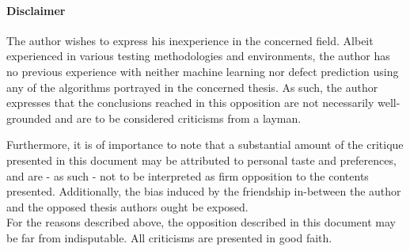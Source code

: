 
\paragraph{Disclaimer}
\label{par:disclaimer}
The author wishes to express his inexperience in the concerned field.
Albeit experienced in various testing methodologies and environments, the author has no previous experience with neither machine learning nor defect prediction using any of the algorithms portrayed in the concerned thesis.
As such, the author expresses that the conclusions reached in this opposition are not necessarily well-grounded and are to be considered criticisms from a layman.

Furthermore, it is of importance to note that a substantial amount of the critique presented in this document may be attributed to personal taste and preferences, and are - as such - not to be interpreted as firm opposition to the contents presented.
Additionally, the bias induced by the friendship in-between the author and the opposed thesis authors ought be exposed.\\

\noindent
For the reasons described above, the opposition described in this document may be far from indisputable.
All criticisms are presented in good faith.